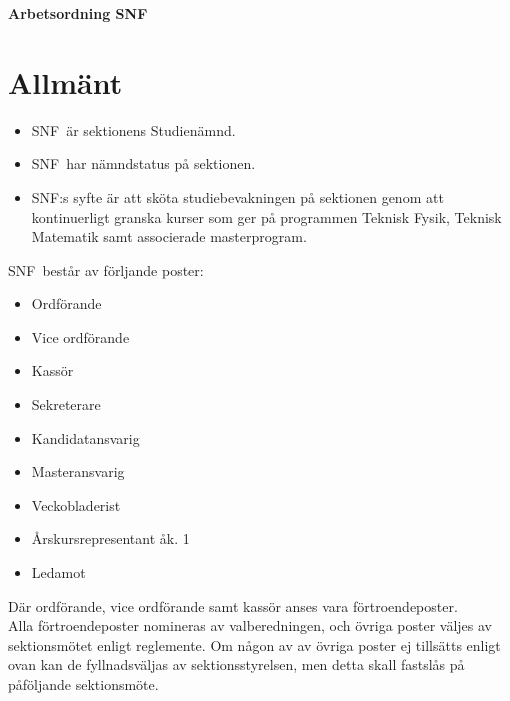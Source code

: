 

\renewcommand{\dateseparator}{-} %

\renewcommand{\forening}{SNF}

\begin{center}
\LARGE{\textbf{Arbetsordning SNF}}
\end{center}





\section{Allmänt}
\begin{itemize}
\item \forening \ är sektionens Studienämnd.\
\item \forening \ har nämndstatus på sektionen.
\item \forening:s syfte är att sköta studiebevakningen på sektionen genom att kontinuerligt granska kurser som ger på programmen Teknisk Fysik, Teknisk Matematik samt associerade masterprogram.
\end{itemize}

\forening \ består av förljande poster:
    \begin{itemize}
        \item Ordförande
        \item Vice ordförande
        \item Kassör
        \item Sekreterare
        \item Kandidatansvarig
        \item Masteransvarig
        \item Veckobladerist
        \item Årskursrepresentant åk. 1
        \item Ledamot
    \end{itemize}

Där ordförande, vice ordförande samt kassör anses vara förtroendeposter. \\

Alla förtroendeposter nomineras av valberedningen, och övriga poster väljes av sektionsmötet enligt reglemente. Om någon av av övriga poster ej tillsätts enligt ovan kan de fyllnadsväljas av sektionsstyrelsen, men detta skall fastslås på påföljande sektionsmöte.

